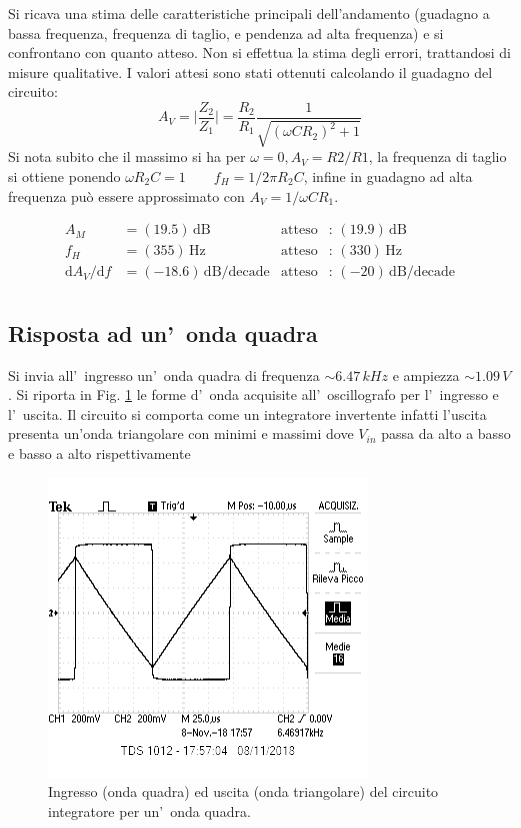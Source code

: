 \documentclass[10pt,a4paper]{article}
\begin{document}
Si ricava una stima delle caratteristiche principali dell'andamento (guadagno a bassa frequenza, frequenza di taglio, e pendenza ad alta frequenza)
e si confrontano con quanto atteso. Non si effettua la stima degli errori, trattandosi di misure qualitative. I valori attesi sono stati ottenuti calcolando il guadagno del circuito:
\begin{equation*}
A_V=\bigg|\frac{Z_2}{Z_1}\bigg|=\frac{R_2}{R_1}\frac{1}{\sqrt{(\omega C R_2)^2 +1}}
\end{equation*}
Si nota subito che il massimo si ha per $\omega=0, A_V=R2/R1$, la frequenza di taglio si ottiene ponendo $\omega R_2 C=1 \qquad f_H = 1/2\pi R_2 C$, infine in guadagno ad alta frequenza può essere approssimato con $A_V = 1/\omega C R_1$.

\begin{align*}
A_M &= (19.5)\,\mathrm{dB} & \mathrm{atteso} &:\,(19.9  )\, \mathrm{dB}  \\
f_H &= (355)\,\mathrm{Hz} & \mathrm{atteso} &:\,(330  )\, \mathrm{Hz} \\
{\mathrm{d}A_V}/{\mathrm{d}f} &= (-18.6)\,\mathrm{dB/decade} & \mathrm{atteso} &:\,(-20 )\, \mathrm{dB/decade}  \\
\end{align*}


%
\subsection*{Risposta ad un'~onda quadra}
Si invia all'~ingresso un'~onda quadra di frequenza $\sim 6.47\,kHz$ e ampiezza $\sim 1.09\,V$.
Si riporta in Fig. \ref{fig:oscinte} le forme d'~onda acquisite all'~oscillografo per l'~ingresso
e l'~uscita. Il circuito si comporta come un integratore invertente infatti l'uscita presenta un'onda triangolare con minimi e massimi dove $V_{in}$ passa da alto a basso e basso a alto rispettivamente

\begin{figure}[htb]
\begin{center}
\includegraphics[width=0.45\linewidth]{screenshot/foto3.png}
\end{center}
\caption{\small Ingresso (onda quadra) ed uscita (onda triangolare) del circuito integratore per un'~onda quadra.}
\label{fig:oscinte}
\end{figure}
%
\end{document}
